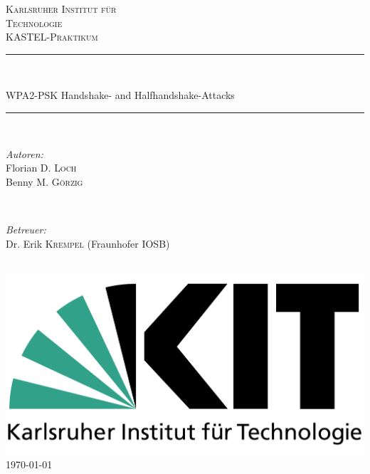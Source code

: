 \begin{titlepage}

\newcommand{\HRule}{\rule{\linewidth}{0.5mm}}

\center

\textsc{\LARGE Karlsruher Institut für }\\[0.5cm]
\textsc{\LARGE Technologie} \\[1.5cm]
\textsc{\Large KASTEL-Praktikum}\\[0.5cm]

\HRule \\[0.4cm]
\begin{huge}
	WPA2-PSK Handshake- and Halfhandshake-Attacks\\[0.4cm] %
\end{huge}
\HRule \\[1.5cm]
 

\begin{minipage}{0.4\textwidth}
\begin{flushleft} \large
\emph{Autoren:}\\
Florian D. \textsc{Loch} \\
Benny M. \textsc{Görzig}
\end{flushleft}
\end{minipage}
~
\begin{minipage}{0.4\textwidth}
\begin{flushright} \large
\emph{Betreuer:} \\
Dr. Erik \textsc{Krempel} (Fraunhofer IOSB)
\end{flushright}
\end{minipage}\\[2cm]

\includegraphics[width=\textwidth/2]{logo}\\[1cm] 

{\large \today}\\[1cm]

\vfill 

\end{titlepage}